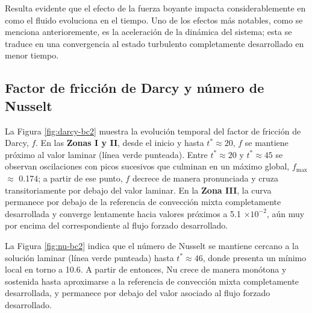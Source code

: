 Resulta evidente que el efecto de la fuerza boyante impacta considerablemente en como el fluido evoluciona en el tiempo. Uno de los efectos más notables, como se menciona anterioremente, es la aceleración de la dinámica del sistema; esta se traduce en una convergencia al estado turbulento completamente desarrollado en menor tiempo.  



\subsection{Factor de fricción de Darcy y número de Nusselt}
La Figura \ref{fig:darcy-bc2} muestra la evolución temporal del factor de fricción de Darcy, $f$. En las \textbf{Zonas I y II}, desde el inicio y hasta $t^* \approx 20$, $f$ se mantiene próximo al valor laminar (línea verde punteada). Entre $t^* \approx 20$ y $t^* \approx 45$ se observan oscilaciones con picos sucesivos que culminan en un máximo global, $f_{\max}$ $\approx$ 0.174; a partir de ese punto, $f$ decrece de manera pronunciada y cruza transitoriamente por debajo del valor laminar. En la \textbf{Zona III}, la curva permanece por debajo de la referencia de convección mixta completamente desarrollada y converge lentamente hacia valores próximos a 5.1 $\times 10^{-2}$, aún muy por encima del correspondiente al flujo forzado desarrollado.

La Figura \ref{fig:nu-bc2} indica que el número de Nusselt se mantiene cercano a la solución laminar (línea verde punteada) hasta $t^* \approx 46$, donde presenta un mínimo local en torno a 10.6. A partir de entonces, $\mathrm{Nu}$ crece de manera monótona y sostenida hasta aproximarse a la referencia de convección mixta completamente desarrollada, y permanece por debajo del valor asociado al flujo forzado desarrollado.


